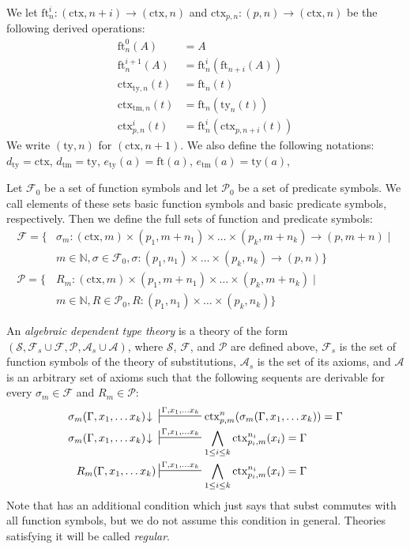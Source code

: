 \documentclass[reqno]{amsart}
\theoremstyle{definition}
\theoremstyle{remark}
\newcommand{\fs}[1]{\mathrm{#1}}
\newcommand{\subst}{\fs{subst}}
\newcommand{\ft}{\fs{ft}}
\newcommand{\ty}{\fs{ty}}
\newcommand{\ctx}{\fs{ctx}}
\newcommand{\tm}{\fs{tm}}
\numberwithin{figure}{section}
\begin{document}
We let $\ft^i_n : (\ctx,n+i) \to (\ctx,n)$ and $\ctx_{p,n} : (p,n) \to (\ctx,n)$ be the following derived operations:
\begin{align*}
\ft^0_n(A)      & = A \\
\ft^{i+1}_n(A)  & = \ft^i_n(\ft_{n+i}(A)) \\
\ctx_{\ty,n}(t) & = \ft_n(t) \\
\ctx_{\tm,n}(t) & = \ft_n(\ty_n(t)) \\
\ctx^i_{p,n}(t) & = \ft^i_n(\ctx_{p,n+i}(t))
\end{align*}
We write $(\ty,n)$ for $(\ctx,n+1)$.
We also define the following notations: $d_\ty = \ctx$, $d_\tm = \ty$, $e_\ty(a) = \ft(a)$, $e_\tm(a) = \ty(a)$,

Let $\mathcal{F}_0$ be a set of function symbols and let $\mathcal{P}_0$ be a set of predicate symbols.
We call elements of these sets basic function symbols and basic predicate symbols, respectively.
Then we define the full sets of function and predicate symbols:
\begin{align*}
\mathcal{F} = \{ & \sigma_m : (\ctx,m) \times (p_1,m+n_1) \times \ldots \times (p_k,m+n_k) \to (p,m+n) \mid \\
                 & m \in \mathbb{N}, \sigma \in \mathcal{F}_0, \sigma : (p_1,n_1) \times \ldots \times (p_k,n_k) \to (p,n) \} \\
\mathcal{P} = \{ & R_m : (\ctx,m) \times (p_1,m+n_1) \times \ldots \times (p_k,m+n_k) \mid \\
                 & m \in \mathbb{N}, R \in \mathcal{P}_0, R : (p_1,n_1) \times \ldots \times (p_k,n_k) \}
\end{align*}

An \emph{algebraic dependent type theory} is a theory of the form $(\mathcal{S}, \mathcal{F}_s \cup \mathcal{F}, \mathcal{P}, \mathcal{A}_s \cup \mathcal{A})$, where $\mathcal{S}$, $\mathcal{F}$, and $\mathcal{P}$ are defined above,
$\mathcal{F}_s$ is the set of function symbols of the theory of substitutions, $\mathcal{A}_s$ is the set of its axioms, and $\mathcal{A}$ is an arbitrary set of axioms such that the following sequents are derivable for every $\sigma_m \in \mathcal{F}$ and $R_m \in \mathcal{P}$:
\begin{align*}
\sigma_m(\Gamma, x_1, \ldots x_k)\!\downarrow\ & \sststile{}{\Gamma, x_1, \ldots x_k} \ctx^n_{p,m}(\sigma_m(\Gamma, x_1, \ldots x_k)) = \Gamma \\
\sigma_m(\Gamma, x_1, \ldots x_k)\!\downarrow\ & \sststile{}{\Gamma, x_1, \ldots x_k} \bigwedge_{1 \leq i \leq k} \ctx^{n_i}_{p_i,m}(x_i) = \Gamma \\
R_m(\Gamma, x_1, \ldots x_k) & \sststile{}{\Gamma, x_1, \ldots x_k} \bigwedge_{1 \leq i \leq k} \ctx^{n_i}_{p_i,m}(x_i) = \Gamma
\end{align*}
Note that \cite[Definition~4.5]{alg-tt} has an additional condition which just says that $\subst$ commutes with all function symbols, but we do not assume this condition in general.
Theories satisfying it will be called \emph{regular}.
\end{document}
